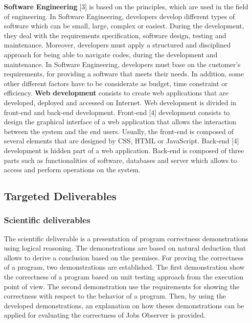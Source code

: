\documentclass[conference,compsoc]{IEEEtran}
\begin{document}
\textbf{Software Engineering} [3] is based on the principles, which are used in the field of engineering. In Software Engineering, developers develop different types of software which can be small, large, complex or easiest. During the development, they deal with the requirements specification, software design, testing and maintenance. Moreover, developers must apply a structured and disciplined approach for being able to navigate codes, during the development and maintenance.  
\newline                                 
In Software Engineering, developers must base on the customer's requirements, for providing a software that meets their needs. In addition, some other different factors have to be considerate as budget, time constraint or efficiency.
\newline\newline
\textbf{Web development} consists to create web applications that are developed, deployed and accessed on Internet. Web development is divided in front-end and back-end development. 
\newline                                   
Front-end [4] development consists to design the graphical interface of a web application that allows the interaction between the system and the end users. Usually, the front-end is composed of several elements that are designed by CSS, HTML or JavaScript.              
\newline                                                                             
Back-end [4] development is hidden part of a web application. Back-end is composed of three parts such as functionalities of software, databases and server which allows to access and perform operations on the system.

\subsection{Targeted Deliverables}
\label{sec-deliverables}
\subsubsection{Scientific deliverables}
The scientific deliverable is a presentation of program correctness demonstrations using logical reasoning. The demonstrations are based on natural deduction that allows to derive a conclusion based on the premises. 
\newline
For proving the correctness of a program, two demonstrations are established. The first demonstration show the correctness of a program based on unit testing approach from the execution point of view. The second demonstration use the requirements for showing the correctness with respect to the behavior of a program.
\newline 
Then, by using the developed demonstrations, an explanation on how theses demonstrations can be applied for evaluating the correctness of Jobs Observer is provided. 
\end{document}
